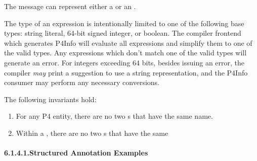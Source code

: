 \documentclass[11pt]{article}
\begin{document}
{%
\noindent{}The  message can represent either a 
or an .%

The type of an expression is intentionally limited to one of the following
base types: string literal, 64-bit signed integer, or boolean. The 
compiler frontend which generates P4Info will evaluate all expressions and
simplify them to one of the valid types. Any expressions which don't match one
of the valid types will generate an error. For integers exceeding 64 bits,
besides issuing an error, the compiler \emph{may} print a suggestion to use a
string representation, and the P4Info consumer may perform any necessary
conversions.%

The following invariants hold:%

\begin{enumerate}%

\item{}
For any P4 entity, there are no two s that have the
same name.%

\item{}
Within a , there are no two s that have the
same %
\end{enumerate}%

\paragraph{6.1.4.1.\hspace*{0.5em}Structured Annotation Examples}\label{sec-structured-annotation-examples}%

}
\end{document}
